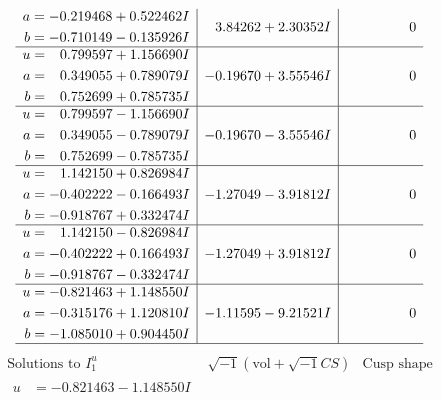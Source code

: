 \documentclass[1p]{elsarticle_modified}
\theoremstyle{definition}
\newcommand{\I}{\sqrt{-1}}
\begin{document}
$$\begin{array}{c|c|c}
\begin{aligned}
a &= -0.219468 + 0.522462 I \\
b &= -0.710149 - 0.135926 I\end{aligned}
 & \phantom{-}3.84262 + 2.30352 I & \phantom{-0.000000 } 0 \\ \hline\begin{aligned}
u &= \phantom{-}0.799597 + 1.156690 I \\
a &= \phantom{-}0.349055 + 0.789079 I \\
b &= \phantom{-}0.752699 + 0.785735 I\end{aligned}
 & -0.19670 + 3.55546 I & \phantom{-0.000000 } 0 \\ \hline\begin{aligned}
u &= \phantom{-}0.799597 - 1.156690 I \\
a &= \phantom{-}0.349055 - 0.789079 I \\
b &= \phantom{-}0.752699 - 0.785735 I\end{aligned}
 & -0.19670 - 3.55546 I & \phantom{-0.000000 } 0 \\ \hline\begin{aligned}
u &= \phantom{-}1.142150 + 0.826984 I \\
a &= -0.402222 - 0.166493 I \\
b &= -0.918767 + 0.332474 I\end{aligned}
 & -1.27049 - 3.91812 I & \phantom{-0.000000 } 0 \\ \hline\begin{aligned}
u &= \phantom{-}1.142150 - 0.826984 I \\
a &= -0.402222 + 0.166493 I \\
b &= -0.918767 - 0.332474 I\end{aligned}
 & -1.27049 + 3.91812 I & \phantom{-0.000000 } 0 \\ \hline\begin{aligned}
u &= -0.821463 + 1.148550 I \\
a &= -0.315176 + 1.120810 I \\
b &= -1.085010 + 0.904450 I\end{aligned}
 & -1.11595 - 9.21521 I & \phantom{-0.000000 } 0\\
 \hline 
 \end{array}$$\newpage$$\begin{array}{c|c|c}  
\text{Solutions to }I^u_{1}& \I (\text{vol} + \sqrt{-1}CS) & \text{Cusp shape}\\
 \hline 
\begin{aligned}
u &= -0.821463 - 1.148550 I \\

\end{aligned}
\end{array}$$
\end{document}
